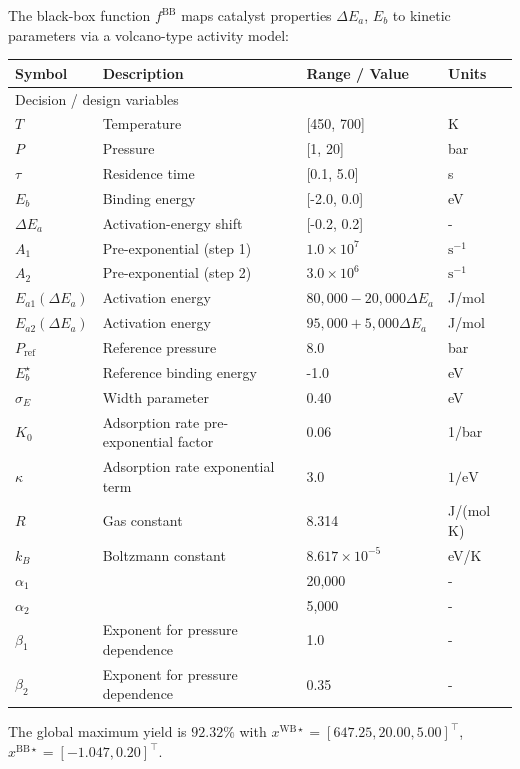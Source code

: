 \documentclass[12pt,a4paper]{article}%
\theoremstyle{plain}%
\theoremstyle{remark}%
\theoremstyle{definition}%
\def\WB{\mathrm{WB}}
\def\BB{\mathrm{BB}}
\begin{document}
\begin{appendices}
The black-box function $f^{\BB}$ maps catalyst properties $\Delta E_a$, $E_b$ to kinetic parameters via a volcano-type activity model:
\begin{table}[htbp]
\begin{tabular}{llll}
    \toprule
    \bf{Symbol} & \bf{Description} & \bf{Range / Value} & \bf{Units} \\
    \midrule
    \multicolumn{4}{l}{Decision / design variables} \\
    \midrule
    $T$ & Temperature & [450, 700] & K \\
    $P$ & Pressure & [1, 20] & bar \\
    $\tau$ & Residence time & [0.1, 5.0] & s \\
    $E_b$ & Binding energy & [-2.0, 0.0] & eV \\
    $\Delta E_a$ & Activation-energy shift & [-0.2, 0.2] & - \\
    \midrule
    $A_1$ & Pre-exponential (step 1) & $1.0 \times 10^7$ & $\mathrm{s}^{-1}$ \\
    $A_2$ & Pre-exponential (step 2) & $3.0 \times 10^6$ & $\mathrm{s}^{-1}$ \\
    $E_{a 1}\left(\Delta E_a\right)$ & Activation energy & $80,000-20,000 \Delta E_a$ & J/mol \\
    $E_{a 2}\left(\Delta E_a\right)$ & Activation energy & $95,000+5,000 \Delta E_a$ & J/mol \\
    $P_{\text {ref }}$ & Reference pressure & 8.0 & bar \\
    $E_b^{\star}$ & Reference binding energy & -1.0 & eV \\
    $\sigma_E$ & Width parameter & 0.40 & eV \\
    $K_0$ & Adsorption rate pre-exponential factor & 0.06 & 1/bar \\
    $\kappa$ & Adsorption rate exponential term & 3.0 & $1 / \mathrm{eV}$ \\
    $R$ & Gas constant & 8.314 & J/(mol K) \\
    $k_B$ & Boltzmann constant & $8.617 \times 10^{-5}$ & eV/K \\
    $\alpha_1$ & & 20,000 & - \\
    $\alpha_2$ & & 5,000 & - \\
    $\beta_1$ & Exponent for pressure dependence & 1.0 & - \\
    $\beta_2$ & Exponent for pressure dependence & 0.35 & - \\
    \bottomrule
\end{tabular}
\end{table}
The global maximum yield is $92.32\%$ with $x^{\WB\star} = [647.25, 20.00, 5.00]^\top$, $x^{\BB\star} = [-1.047, 0.20]^\top$.


\end{appendices}
\end{document}
